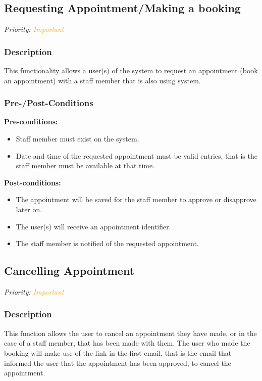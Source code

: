 \subsection{Requesting Appointment/Making a booking}
\textit{Priority: \textcolor{orange}{Important}} 

\subsubsection{Description}

This functionality allows a user(s) of the system to request an appointment (book an appointment) with a staff member that is also using system. 


\subsubsection{Pre-/Post-Conditions}
\textbf{Pre-conditions:} 
	\begin{itemize}
		\item Staff member must exist on the system.
		\item Date and time of the requested appointment must be valid entries, that is the staff member must be available at that time.
	\end{itemize}
\textbf{Post-conditions:} 
	\begin{itemize}
		\item The appointment will be saved for the staff member to approve or disapprove later on.
		\item The user(s) will receive an appointment identifier.
		\item The staff member is notified of the requested appointment. 
	\end{itemize}

\subsection{Cancelling Appointment}
\textit{Priority: \textcolor{orange}{Important}} 

\subsubsection{Description}
This function allows the user to cancel an appointment they have made, or in the case of a staff member, that has been made with them. The user who made the booking will make use of the link in the first email, that is the email that informed the user that the appointment has been approved, to cancel the appointment. 


